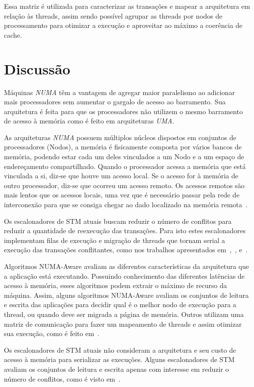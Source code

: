 \documentclass[diss,capa]{texufpel}
\begin{document}
Essa matriz é utilizada para caracterizar as transações e mapear a arquitetura em relação às threads, assim sendo possível agrupar as threads por nodos de processamento para otimizar a execução e aproveitar ao máximo a coerência de cache.

\section{Discussão}

Máquinas \emph{NUMA} têm a vantagem de agregar maior paralelismo ao adicionar mais processadores sem aumentar o gargalo de acesso ao barramento. Sua arquitetura é feita para que os processadores não utilizem o mesmo barramento de acesso à memória como é feito em arquiteturas \emph{UMA}.

As arquiteturas \emph{NUMA} possuem múltiplos núcleos dispostos em conjuntos de processadores (Nodos), a memória é fisicamente composta por vários bancos de memória, podendo estar cada um deles vinculados a um Nodo e a um espaço de endereçamento compartilhado. Quando o processador acessa a memória que está vinculada a si, diz-se que houve um acesso local. Se o acesso for à memória de outro processador, diz-se que ocorreu um acesso remoto. Os acessos remotos são mais lentos que os acessos locais, uma vez que é necessário passar pela rede de interconexão para que se consiga chegar ao dado localizado na memória remota~\cite{Rodolfo:2014}.

Os escalonadores de STM atuais buscam reduzir o número de conflitos para reduzir a quantidade de reexecução das transações. Para isto estes escalonadores implementam filas de execução e migração de threads que tornam serial a execução das transações conflitantes, como nos trabalhos apresentados em~\cite{shrink2009},~\cite{Nicacio2012}, e~\cite{rito2015}.

Algoritmos NUMA-Aware avaliam as diferentes características da arquitetura que a aplicação está executando. Possuindo conhecimento das diferentes latências de acesso à memória, esses algoritmos podem extrair o máximo de recurso da máquina. Assim, alguns algoritmos NUMA-Aware avaliam os conjuntos de leitura e escrita das aplicações para decidir qual é o melhor nodo de execução para a thread, ou quando deve ser migrada a página de memória. Outros utilizam uma matriz de comunicação para fazer um mapeamento de threads e assim otimizar sua execução, como é feito em~\cite{pasqualin2020thread}.

Os escalonadores de STM atuais não consideram a arquitetura e seu custo de acesso à memória para serializar as execuções. Alguns escalonadores de STM avaliam os conjuntos de leitura e escrita apenas com interesse em reduzir o número de conflitos, como é visto em~\cite{shrink2009}.
\end{document}
